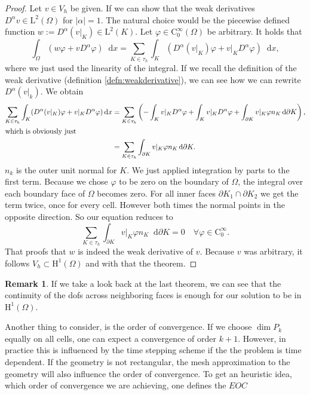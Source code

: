 \documentclass[12pt,a4paper,twoside, open=right]{scrreprt}
\theoremstyle{definition}
\newtheorem{rem}[auf]{Remark}
\theoremstyle{plain}
\newcommand{\abs}[1]{\left\vert #1\right\vert}
\newcommand{\D}{\mathop{}\!\mathrm{d}}
\begin{document}
\begin{proof}
    Let $v\in V_h$ be given. If we can show that the weak derivatives $D^\alpha v\in \mathrm{L}^2(\Omega)$ for $\abs{\alpha}=1$. The natural choice would be the piecewise defined function $w:=D^\alpha(v\vert_K)\in \mathrm{L}^2(K)$. Let $\varphi\in \mathrm{C}^\infty_0(\Omega)$ be arbitrary. It holds that 
    \begin{equation}
        \int_\Omega(w\varphi+vD^\alpha \varphi)\D x = \sum_{K\in\tau_h}\int_K(D^\alpha(v\vert_K)\varphi+v\vert_K D^\alpha\varphi)\D x,
    \end{equation}
    where we just used the linearity of the integral. If we recall the definition of the weak derivative (definition \ref{defn:weakderivative}), we can see how we can rewrite $D^\alpha(v\vert_k)$. We obtain
    \begin{align}
        \sum_{K\in\tau_h}\int_K(D^\alpha(v\vert_K)\varphi+v\vert_K D^\alpha\varphi)\D x&=\sum_{K\in\tau_h}\left(-\int_K v\vert_KD^\alpha\varphi+\int_K v\vert_K D^\alpha\varphi +\int_{\partial K}v\vert_K\varphi n_K\D\partial K\right),\\\intertext{which is obviously just}& =\sum_{K\in\tau_h}\int_{\partial K}v\vert_K\varphi n_K\D\partial K.
    \end{align}
    $n_k$ is the outer unit normal for $K$. We just applied integration by parts to the first term. Because we chose $\varphi$ to be zero on the boundary of $\Omega$, the integral over each boundary face of $\Omega$ becomes zero. For all inner faces $\partial K_1\cap \partial K_2$ we get the term twice, once for every cell. However both times the normal points in the opposite direction. So our equation reduces to 
    \begin{equation}
        \sum_{K\in\tau_h}\int_{\partial K}v\vert_K\varphi n_K\D\partial K=0 \quad \forall\varphi\in \mathrm{C}^\infty_0.
    \end{equation}
    That proofs that $w$ is indeed the weak derivative of $v$. Because $v$ was arbitrary, it follows $V_h\subset \mathrm{H}^1(\Omega)$ and with that the theorem.
\end{proof}
\begin{rem}
    If we take a look back at the last theorem, we can see that the continuity of the dofs across neighboring faces is enough for our solution to be in $\mathrm{H}^1(\Omega)$. 
\end{rem}
Another thing to consider, is the order of convergence. If we choose $\dim P_k$ equally on all cells, one can expect a convergence of order $k+1$. However, in practice this is influenced by the time stepping scheme if the the problem is time dependent. If the geometry is not rectangular, the mesh approximation to the geometry will also influence the order of convergence. To get an heuristic idea, which order of convergence we are achieving, one defines the $EOC$
\end{document}
